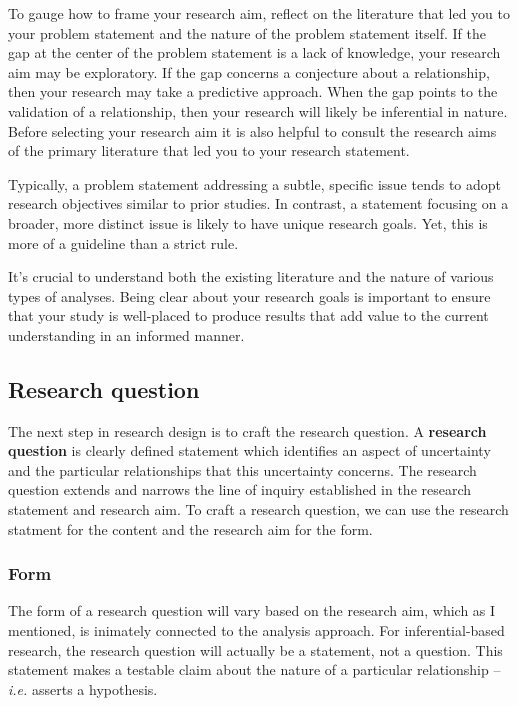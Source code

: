 \documentclass[
  letterpaper,
  DIV=11,
  numbers=noendperiod]{scrreprt}
\theoremstyle{definition}
\theoremstyle{remark}
\begin{document}
To gauge how to frame your research aim, reflect on the literature that
led you to your problem statement and the nature of the problem
statement itself. If the gap at the center of the problem statement is a
lack of knowledge, your research aim may be exploratory. If the gap
concerns a conjecture about a relationship, then your research may take
a predictive approach. When the gap points to the validation of a
relationship, then your research will likely be inferential in nature.
Before selecting your research aim it is also helpful to consult the
research aims of the primary literature that led you to your research
statement.

Typically, a problem statement addressing a subtle, specific issue tends
to adopt research objectives similar to prior studies. In contrast, a
statement focusing on a broader, more distinct issue is likely to have
unique research goals. Yet, this is more of a guideline than a strict
rule.

It's crucial to understand both the existing literature and the nature
of various types of analyses. Being clear about your research goals is
important to ensure that your study is well-placed to produce results
that add value to the current understanding in an informed manner.

\subsection{Research question}\label{sec-fr-question}

The next step in research design is to craft the research question. A
\textbf{research question} is clearly defined
statement which identifies an aspect of uncertainty and the particular
relationships that this uncertainty concerns. The research question
extends and narrows the line of inquiry established in the research
statement and research aim. To craft a research question, we can use the
research statment for the content and the research aim for the form.

\subsubsection{Form}\label{sec-fr-question-form}

The form of a research question will vary based on the research aim,
which as I mentioned, is inimately connected to the analysis approach.
For inferential-based research, the research question will actually be a
statement, not a question. This statement makes a testable claim about
the nature of a particular relationship --\emph{i.e.} asserts a
hypothesis.
\end{document}
